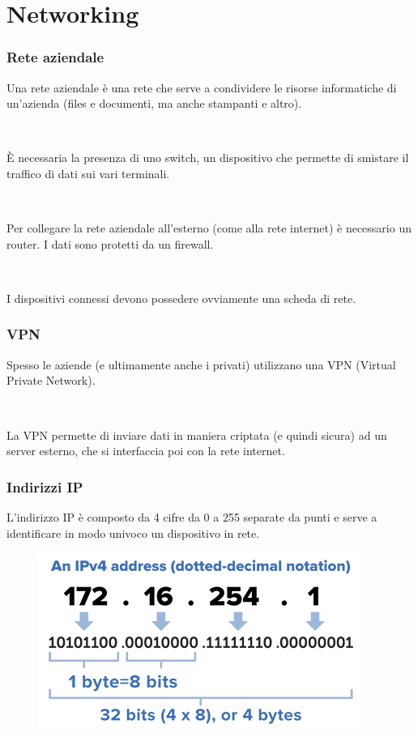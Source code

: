\documentclass[]{beamer}
\begin{document}
\section{Networking}

\begin{frame}
\frametitle{Rete aziendale}
Una rete aziendale è una rete che serve a condividere le risorse informatiche di un'azienda (files e documenti, ma anche stampanti e altro).\pause

~

È necessaria la presenza di uno \alert<2>{switch}, un dispositivo che permette di smistare il traffico di dati sui vari terminali.\pause

~

Per collegare la rete aziendale all'esterno (come alla rete internet) è necessario un \alert<3>{router}. I dati sono protetti da un \alert<3>{firewall}.\pause

~

I dispositivi connessi devono possedere ovviamente una \alert<4>{scheda di rete}.
\end{frame}



\begin{frame}
\frametitle{VPN}
Spesso le aziende (e ultimamente anche i privati) utilizzano una VPN (Virtual Private Network).\pause

~

La VPN permette di inviare dati in maniera criptata (e quindi sicura) ad un server esterno, che si interfaccia poi con la rete internet.

\end{frame}




\begin{frame}
\frametitle{Indirizzi IP}
L'indirizzo IP è composto da \alert<1>{4 cifre da 0 a 255 separate da punti} e serve a identificare in modo univoco un dispositivo in rete.
~

\begin{figure}
  \includegraphics[width=.6\columnwidth]{img/ip.png}
\end{figure}
\end{frame}
\end{document}
